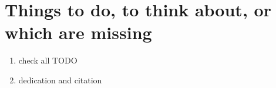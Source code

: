 
\chapter{Things to do, to think about, or which are missing}
\begin{enumerate}
\item check all TODO
\item dedication and citation
\end{enumerate}